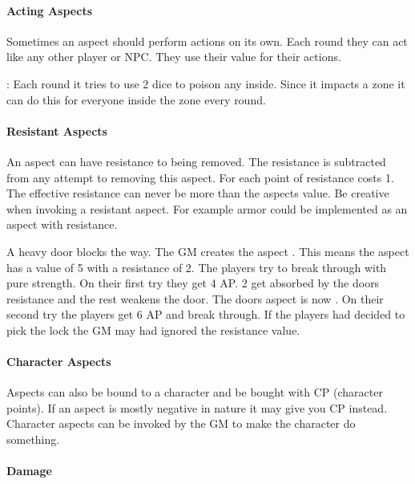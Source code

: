 \documentclass[11pt]{article}
\begin{document}
{\paragraph*{Acting Aspects}
\label{sec:org3a01ed1}

Sometimes an aspect should perform actions on its own. Each round they can act like any other player or NPC. They use their value for their actions.

\begin{pwexample}
: Each round it tries to use 2 dice to poison any inside. Since it impacts a zone it can do this for everyone inside the zone every round.
\end{pwexample}

\paragraph*{Resistant Aspects}
\label{sec:org03d5237}
An aspect can have resistance to being removed. The resistance is subtracted from any attempt to removing this aspect. For each point of resistance costs 1. The effective resistance can never be more than the aspects value. Be creative when invoking a resistant aspect. For example armor could be implemented as an aspect with resistance.

\begin{pwexample}
A heavy door blocks the way. The GM creates the aspect . This means the aspect has a value of 5 with a resistance of 2. The players try to break through with pure strength. On their first try they get 4 AP. 2 get absorbed by the doors resistance and the rest weakens the door. The doors aspect is now . On their second try the players get 6 AP and break through.
If the players had decided to pick the lock the GM may had ignored the resistance value.
\end{pwexample}


\paragraph*{Character Aspects}
\label{sec:org3af7277}

Aspects can also be bound to a character and be bought with CP (character points). If an aspect is mostly negative in nature it may give you CP instead. Character aspects can be invoked by the GM to make the character do something. 

\paragraph*{Damage}
\label{sec:org078bb98}

}
\end{document}
